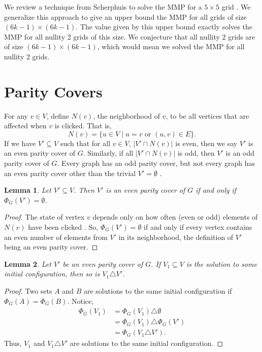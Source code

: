 \documentclass[a4paper]{article}
\newtheorem{lemma}{Lemma}
\newcommand{\abs}[1]{\left| #1 \right|}
\begin{document}
	We review a technique from Scherphuis to solve the MMP for a $5 \times 5$ grid \cite{jaap}.
	We generalize this approach to give an upper bound the MMP for all grids of size $(6k-1) \times (6k-1)$.
	The value given by this upper bound exactly solves the MMP for all nullity 2 grids of this size.
	We conjecture that all nullity 2 grids are of size $(6k-1) \times (6k-1)$, which would mean we solved the MMP for all nullity 2 grids.
	
	\section{Parity Covers}
	For any $v \in V$, define $N(v)$, the neighborhood of $v$, to be all vertices that are affected when $v$ is clicked.
	That is,
	\begin{equation*}
		N(v) = \{u \in V \mid u=v \text{ or } (u,v) \in E\}.
	\end{equation*}
	If we have $V' \subseteq V$ such that for all $v \in V$, $\abs{V' \cap N(v)}$ is even, then we say $V'$ is an even parity cover of $G$.
	Similarly, if all $\abs{V' \cap N(v)}$ is odd, then $V'$ is an odd parity cover of $G$.
	Every graph has an odd parity cover, but not every graph has an even parity cover other than the trivial $V' = \emptyset$ \cite{Sutner1989}.
	
	\begin{lemma}\label{empty-is-even}
		Let $V' \subseteq V$.
		Then $V'$ is an even parity cover of $G$ if and only if $\Phi_G(V') = \emptyset$.
	\end{lemma}
	\begin{proof}
		The state of vertex $v$ depends only on how often (even or odd) elements of $N(v)$ have been clicked \cite{Sutner1989}.
		So, $\Phi_G(V') = \emptyset$ if and only if every vertex contains an even number of elements from $V'$ in its neighborhood, the definition of $V'$ being an even parity cover.
	\end{proof}
	
	\begin{lemma}
		Let $V'$ be an even parity cover of $G$.
		If $V_1 \subseteq V$ is the solution to some initial configuration, then so is $V_1 \triangle V'$.
	\end{lemma}
	\begin{proof}
		Two sets $A$ and $B$ are solutions to the same initial configuration if $\Phi_G(A) = \Phi_G(B)$.
		Notice,
		\begin{align*}
			\Phi_G(V_1) &= \Phi_G(V_1) \triangle \emptyset \\
			&= \Phi_G(V_1) \triangle \Phi_G(V') \\
			&= \Phi_G(V_1 \triangle V').
		\end{align*}
		Thus, $V_1$ and $V_1 \triangle V'$ are solutions to the same initial configuration.
	\end{proof}
\end{document}
